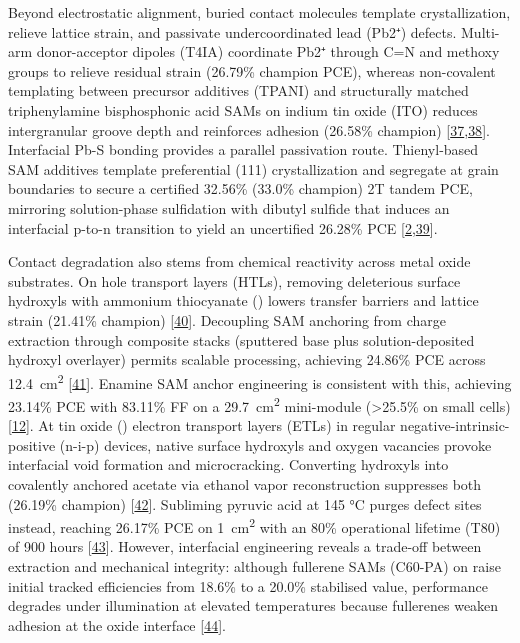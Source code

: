 \documentclass[
  11pt,
]{article}
\begin{document}
Beyond electrostatic alignment, buried contact molecules template
crystallization, relieve lattice strain, and passivate undercoordinated
lead (Pb2⁺) defects. Multi-arm donor-acceptor dipoles (T4IA) coordinate
Pb2⁺ through C=N and methoxy groups to relieve residual strain (26.79\%
champion PCE), whereas non-covalent templating between precursor
additives (TPANI) and structurally matched triphenylamine bisphosphonic
acid SAMs on indium tin oxide (ITO) reduces intergranular groove depth
and reinforces adhesion (26.58\% champion)
{[}\href{https://doi.org/10.1002/anie.3716107}{37},\href{https://doi.org/10.1002/anie.6932848}{38}{]}.
Interfacial Pb-S bonding provides a parallel passivation route.
Thienyl-based SAM additives template preferential (111) crystallization
and segregate at grain boundaries to secure a certified 32.56\% (33.0\%
champion) 2T tandem PCE, mirroring solution-phase sulfidation with
dibutyl sulfide that induces an interfacial p-to-n transition to yield
an uncertified 26.28\% PCE
{[}\href{https://doi.org/10.1002/anie.5241611}{2},\href{https://doi.org/10.1021/acsami.6c07884}{39}{]}.

Contact degradation also stems from chemical reactivity across metal
oxide substrates. On  hole transport layers (HTLs), removing
deleterious surface hydroxyls with ammonium thiocyanate ()
lowers transfer barriers and lattice strain (21.41\% champion)
{[}\href{https://doi.org/10.1021/acsaem.6c01708}{40}{]}. Decoupling SAM
anchoring from charge extraction through composite  stacks
(sputtered base plus solution-deposited hydroxyl overlayer) permits
scalable processing, achieving 24.86\% PCE across
\qty{12.4}{\centi\meter\squared}
{[}\href{https://doi.org/10.1002/smll.75056}{41}{]}. Enamine SAM anchor
engineering is consistent with this, achieving 23.14\% PCE with 83.11\%
FF on a \qty{29.7}{\centi\meter\squared} mini-module (\textgreater25.5\%
on small cells) {[}\href{https://doi.org/10.1002/advs.76950}{12}{]}. At
tin oxide () electron transport layers (ETLs) in regular
negative-intrinsic-positive (n-i-p) devices, native surface hydroxyls
and oxygen vacancies provoke interfacial void formation and
microcracking. Converting hydroxyls into covalently anchored acetate via
ethanol vapor reconstruction suppresses both (26.19\% champion)
{[}\href{https://doi.org/10.1002/smll.75122}{42}{]}. Subliming pyruvic
acid at 145 °C purges defect sites instead, reaching 26.17\% PCE on
\qty{1}{\centi\meter\squared} with an 80\% operational lifetime (T80) of
900 hours {[}\href{https://doi.org/10.1002/aenm.71514}{43}{]}. However,
interfacial engineering reveals a trade-off between extraction and
mechanical integrity: although fullerene SAMs (C60-PA) on 
raise initial tracked efficiencies from 18.6\% to a 20.0\% stabilised
value, performance degrades under illumination at elevated temperatures
because fullerenes weaken adhesion at the oxide interface
{[}\href{https://doi.org/10.1021/acsenergylett.6c01485}{44}{]}.
\end{document}

